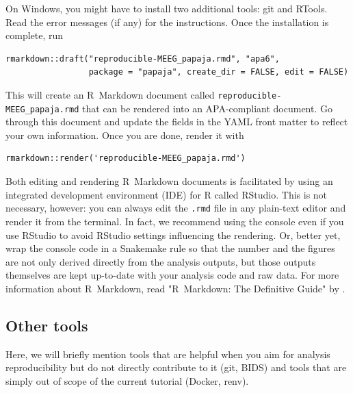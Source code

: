 \documentclass[a4paper,man,floatsintext,natbib]{apa6}
\begin{document}
On Windows, you might have to install two additional tools: git and RTools. Read the error messages (if any) for the instructions. Once the installation is complete, run

\begin{verbatim}
rmarkdown::draft("reproducible-MEEG_papaja.rmd", "apa6", 
                 package = "papaja", create_dir = FALSE, edit = FALSE)
\end{verbatim}

This will create an R~Markdown document called \verb|reproducible-MEEG_papaja.rmd| that can be rendered into an APA-compliant document. Go through this document and update the fields in the YAML front matter to reflect your own information. Once you are done, render it with

\begin{verbatim}
rmarkdown::render('reproducible-MEEG_papaja.rmd')
\end{verbatim}

Both editing and rendering R~Markdown documents is facilitated by using an integrated development environment (IDE) for R called RStudio. This is not necessary, however: you can always edit the \verb|.rmd| file in any plain-text editor and render it from the terminal. In fact, we recommend using the console even if you use RStudio to avoid RStudio settings influencing the rendering. Or, better yet, wrap the console code in a Snakemake rule so that the number and the figures are not only derived directly from the analysis outputs, but those outputs themselves are kept up-to-date with your analysis code and raw data. For more information about R~Markdown, read "R~Markdown: The Definitive Guide" by \cite{xieMarkdownDefinitiveGuide2019}.

\subsection{Other tools}
Here, we will briefly mention tools that are helpful when you aim for analysis reproducibility but do not directly contribute to it (git, BIDS) and tools that are simply out of scope of the current tutorial (Docker, renv).
\end{document}
